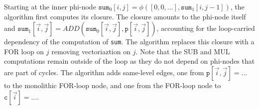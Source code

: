 \documentclass[sigconf, screen, natbib=false, dvipsnames, table]{acmart}
\theoremstyle{definition}
\begin{document}
Starting at the inner phi-node $\texttt{sum}_0[i,j] = \phi([0,0,...],\texttt{sum}_1[i,j-1])$, the algorithm first computes its closure. The closure amounts to the phi-node itself and $\texttt{sum}_1[\stackrel{\rightarrow}{i},\stackrel{\rightarrow}{j}] = \mathit{ADD}(\texttt{sum}_0[\stackrel{\rightarrow}{i},\stackrel{\rightarrow}{j}],\texttt{p}[\stackrel{\rightarrow}{i},\stackrel{\rightarrow}{j}])$, accounting for the loop-carried dependency of the computation of \texttt{sum}. The algorithm replaces this closure with a FOR loop on $j$ removing vectoriaztion on $j$. Note that the SUB and MUL computations remain outside of the loop as they do not depend on phi-nodes that are part of cycles. The algorithm adds same-level edges, one from $\texttt{p}[\stackrel{\rightarrow}{i},\stackrel{\rightarrow}{j}] = ...$ to the monolithic FOR-loop node, and one from the FOR-loop node to $\texttt{c}[\stackrel{\rightarrow}{i}] = ...$.


\begin{algorithmic}

\STATE {}




\STATE {}
 
\STATE {}
\STATE {}

\STATE {}

\end{algorithmic}
\end{document}
